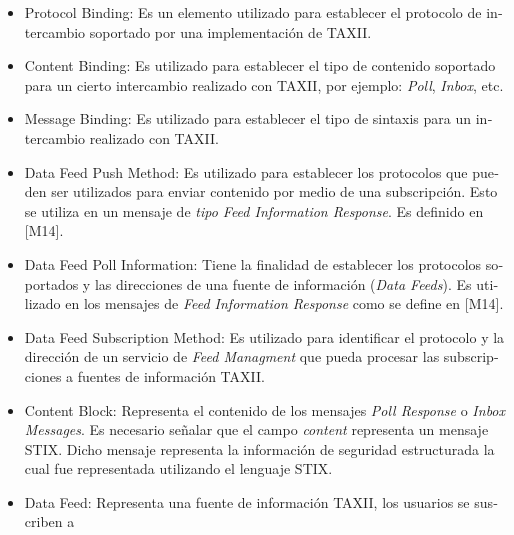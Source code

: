 	\begin{itemize}
		\item \foreignlanguage{spanish}{Protocol Binding: Es un elemento utilizado para establecer el protocolo de intercambio
			soportado por una implementación de TAXII.}
		\item \foreignlanguage{spanish}{Content Binding: Es utilizado para establecer el tipo de contenido soportado para un
			cierto intercambio realizado con TAXII, por ejemplo:
		}\foreignlanguage{spanish}{\textit{Poll}}\foreignlanguage{spanish}{,
	}\foreignlanguage{spanish}{\textit{Inbox}}\foreignlanguage{spanish}{, etc.}
	\item \foreignlanguage{spanish}{Message Binding: Es utilizado para establecer el tipo de sintaxis para un intercambio
		realizado con TAXII.}
	\item \foreignlanguage{spanish}{Data Feed Push Method: Es utilizado para establecer los protocolos que pueden ser
		utilizados para enviar contenido por medio de una subscripción. Esto se utiliza en un mensaje de
	}\foreignlanguage{spanish}{\textit{tipo Feed Information Response}}\foreignlanguage{spanish}{. Es definido en [M14].}
	\item \foreignlanguage{spanish}{Data Feed Poll Information: Tiene la finalidad de establecer los protocolos soportados y
		las direcciones de una fuente de información (}\foreignlanguage{spanish}{\textit{Data
			Feeds}}\foreignlanguage{spanish}{). Es utilizado en los mensajes de }\foreignlanguage{spanish}{\textit{Feed Information
			Response}}\foreignlanguage{spanish}{ como se define en [M14].}
	\item \foreignlanguage{spanish}{Data Feed Subscription Method: Es utilizado para identificar el protocolo y la dirección
		de un servicio de }\foreignlanguage{spanish}{\textit{Feed Managment}}\foreignlanguage{spanish}{ que pueda procesar las
		subscripciones a fuentes de información TAXII.}
	\item \foreignlanguage{spanish}{Content Block: Representa el contenido de los mensajes
	}\foreignlanguage{spanish}{\textit{Poll Response }}\foreignlanguage{spanish}{o }\foreignlanguage{spanish}{\textit{Inbox
		Messages}}\foreignlanguage{spanish}{. Es necesario señalar que el campo
}\foreignlanguage{spanish}{\textit{content}}\foreignlanguage{spanish}{ representa un mensaje STIX. Dicho mensaje
representa la información de seguridad estructurada la cual fue representada utilizando el lenguaje STIX.}
\item \foreignlanguage{spanish}{Data Feed: Representa una fuente de información TAXII, los usuarios se suscriben a
}
\end{itemize}
